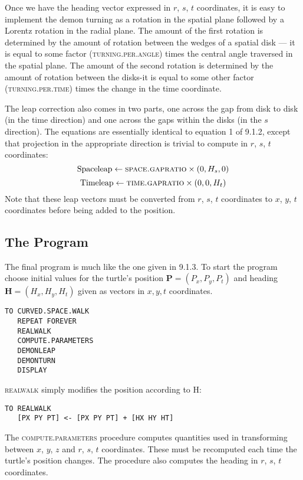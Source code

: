 \documentclass{book}
\begin{document}
Once we have the heading vector expressed in $r$, $s$, $t$ coordinates, it is
easy to implement the demon turning as a rotation in the spatial plane
followed by a Lorentz rotation in the radial plane. The amount of
the first rotation is determined by the amount of rotation between the
wedges of a spatial disk --- it is equal to some factor (\textsc{turning}\textsc{.per}\textsc{.angle})
times the central angle traversed in the spatial plane. The amount of
the second rotation is determined by the amount of rotation between
the disks-it is equal to some other factor (\textsc{turning}\textsc{.per}\textsc{.time}) times
the change in the time coordinate.

The leap correction also comes in two parts, one across the gap from
disk to disk (in the time direction) and one across the gaps within the
disks (in the $s$ direction). The equations are essentially identical to
equation 1 of 9.1.2, except that projection in the appropriate direction
is trivial to compute in $r$, $s$, $t$ coordinates:
$$\operatorname{Spaceleap} \leftarrow \text{\textsc{space}\textsc{.gapratio}}  \times (0, H_s, 0)$$
$$\operatorname{Timeleap} \leftarrow \text{\textsc{time}\textsc{.gapratio}}  \times (0, 0, H_t)$$
Note that these leap vectors must be converted from $r$, $s$, $t$ coordinates
to $x$, $y$, $t$ coordinates before being added to the position.

\subsection{The Program}

The final program is much like the one given in 9.1.3. To start the
program choose initial values for the turtle's position $\mathbf{P} = (P_x, P_y, P_t)$
and heading $\mathbf{H} = (H_x, H_y, H_t)$ given as vectors in $x, y, t$ coordinates.

\begin{verbatim}
TO CURVED.SPACE.WALK
   REPEAT FOREVER
   REALWALK
   COMPUTE.PARAMETERS
   DEMONLEAP
   DEMONTURN
   DISPLAY
\end{verbatim}
\textsc{realwalk} simply modifies the position according to H:

\begin{verbatim}
TO REALWALK
   [PX PY PT] <- [PX PY PT] + [HX HY HT]
\end{verbatim}
The \textsc{compute}\textsc{.parameters} procedure computes quantities used in transforming between $x$, $y$, $z$ and $r$, $s$, $t$ coordinates. These must be recomputed each time the turtle's position changes. The procedure also computes the heading in $r$, $s$, $t$ coordinates.
\end{document}
